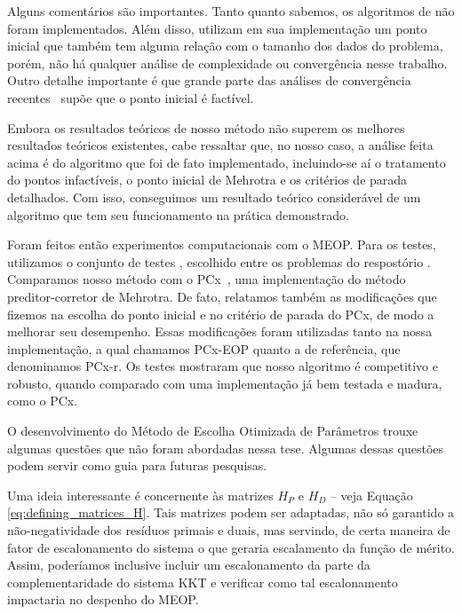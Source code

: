 Alguns  comentários são importantes. Tanto quanto sabemos, os algoritmos de \textcite{Zhang:1996it,Zhang:2006ic,Wright:1996kj} não foram implementados. Além disso, \textcite{Gertz:2003ji} utilizam em sua implementação um ponto inicial que também tem alguma relação com o tamanho dos dados do problema, porém, não há qualquer análise de complexidade ou convergência nesse trabalho. Outro detalhe importante é que  grande parte das análises de convergência recentes~\cite{Gondzio:2011ta} supõe que o ponto inicial é factível. 

Embora os resultados teóricos de nosso método  não superem os melhores resultados teóricos existentes, cabe ressaltar que, no nosso caso, a análise feita acima é do algoritmo que foi de fato implementado, incluindo-se aí o tratamento do pontos infactíveis, o ponto inicial de Mehrotra e os critérios de parada detalhados. Com isso, conseguimos um resultado teórico considerável de um algoritmo que tem seu funcionamento na prática demonstrado.



Foram feitos então experimentos computacionais com o MEOP.  Para os testes, utilizamos o conjunto de testes , escolhido entre os problemas do respostório \Netlib. Comparamos nosso método com o PCx~\cite{Czyzyk:1999hk}, uma implementação do método preditor-corretor de Mehrotra. De fato, relatamos também as modificações que fizemos na escolha do ponto inicial e no critério de parada do PCx, de modo a melhorar seu desempenho. Essas modificações foram utilizadas tanto na nossa implementação, a qual chamamos PCx-EOP quanto a de referência, que denominamos PCx-r. Os testes mostraram que nosso algoritmo é competitivo e robusto, quando comparado com uma implementação já bem testada e madura, como o PCx. 





O desenvolvimento do Método de Escolha Otimizada de Parâmetros trouxe algumas questões que 
não foram  abordadas nessa tese. Algumas dessas questões podem servir como guia para futuras pesquisas.

Uma ideia interessante é concernente às matrizes $H_P$ e $H_D$  -- veja Equação
\eqref{eq:defining_matrices_H}. Tais matrizes podem ser adaptadas, não só garantido a
não-negatividade dos resíduos primais e duais, mas servindo, de certa maneira  de  fator de escalonamento do sistema o que geraria escalamento da função de mérito. Assim, poderíamos inclusive incluir um escalonamento da parte da complementaridade do sistema KKT e verificar como tal escalonamento impactaria no despenho do MEOP.


